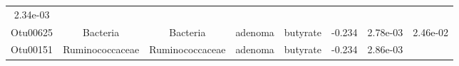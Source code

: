 \documentclass[11pt,]{article}
\begin{document}
\begin{longtable}[]{@{}cccccccc@{}}
\begin{minipage}[t]{0.08\columnwidth}
2.34e-03\strut
\end{minipage}\tabularnewline
\begin{minipage}[t]{0.08\columnwidth}\centering\strut
Otu00625\strut
\end{minipage} & \begin{minipage}[t]{0.15\columnwidth}\centering\strut
Bacteria\strut
\end{minipage} & \begin{minipage}[t]{0.15\columnwidth}\centering\strut
Bacteria\strut
\end{minipage} & \begin{minipage}[t]{0.08\columnwidth}\centering\strut
adenoma\strut
\end{minipage} & \begin{minipage}[t]{0.09\columnwidth}\centering\strut
butyrate\strut
\end{minipage} & \begin{minipage}[t]{0.07\columnwidth}\centering\strut
-0.234\strut
\end{minipage} & \begin{minipage}[t]{0.08\columnwidth}\centering\strut
2.78e-03\strut
\end{minipage} & \begin{minipage}[t]{0.08\columnwidth}\centering\strut
2.46e-02\strut
\end{minipage}\tabularnewline
\begin{minipage}[t]{0.08\columnwidth}\centering\strut
Otu00151\strut
\end{minipage} & \begin{minipage}[t]{0.15\columnwidth}\centering\strut
Ruminococcaceae\strut
\end{minipage} & \begin{minipage}[t]{0.15\columnwidth}\centering\strut
Ruminococcaceae\strut
\end{minipage} & \begin{minipage}[t]{0.08\columnwidth}\centering\strut
adenoma\strut
\end{minipage} & \begin{minipage}[t]{0.09\columnwidth}\centering\strut
butyrate\strut
\end{minipage} & \begin{minipage}[t]{0.07\columnwidth}\centering\strut
-0.234\strut
\end{minipage} & \begin{minipage}[t]{0.08\columnwidth}\centering\strut
2.86e-03\strut
\end{minipage} & \begin{minipage}[t]{0.08\columnwidth}\centering\strut

\end{minipage}
\end{longtable}
\end{document}
